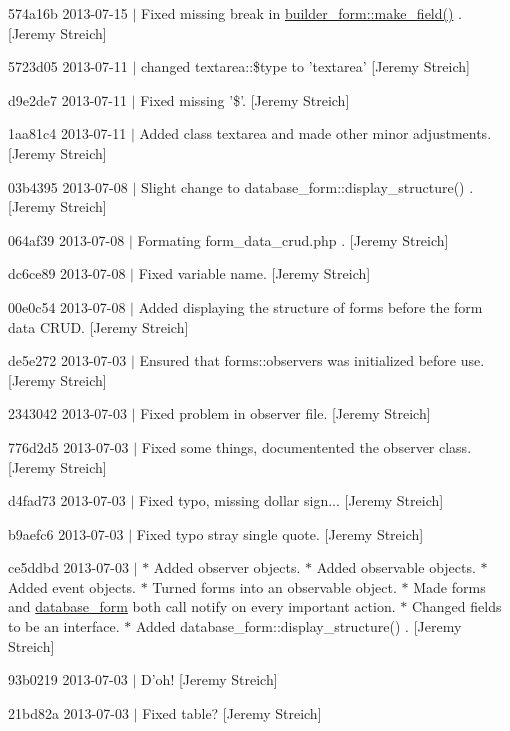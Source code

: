 \begin{DoxyItemize}
\item 574a16b 2013-\/07-\/15 $|$ Fixed missing break in \hyperlink{classbuilder__form_a6408926fe73438032738d8a0095acf8d}{builder\-\_\-form\-::make\-\_\-field()} . \mbox{[}Jeremy Streich\mbox{]}
\item 5723d05 2013-\/07-\/11 $|$ changed textarea\-::\$type to 'textarea' \mbox{[}Jeremy Streich\mbox{]}
\item d9e2de7 2013-\/07-\/11 $|$ Fixed missing '\$'. \mbox{[}Jeremy Streich\mbox{]}
\item 1aa81c4 2013-\/07-\/11 $|$ Added class textarea and made other minor adjustments. \mbox{[}Jeremy Streich\mbox{]}
\item 03b4395 2013-\/07-\/08 $|$ Slight change to database\-\_\-form\-::display\-\_\-structure() . \mbox{[}Jeremy Streich\mbox{]}
\item 064af39 2013-\/07-\/08 $|$ Formating form\-\_\-data\-\_\-crud.\-php . \mbox{[}Jeremy Streich\mbox{]}
\item dc6ce89 2013-\/07-\/08 $|$ Fixed variable name. \mbox{[}Jeremy Streich\mbox{]}
\item 00e0c54 2013-\/07-\/08 $|$ Added displaying the structure of forms before the form data C\-R\-U\-D. \mbox{[}Jeremy Streich\mbox{]}
\item de5e272 2013-\/07-\/03 $|$ Ensured that forms\-::observers was initialized before use. \mbox{[}Jeremy Streich\mbox{]}
\item 2343042 2013-\/07-\/03 $|$ Fixed problem in observer file. \mbox{[}Jeremy Streich\mbox{]}
\item 776d2d5 2013-\/07-\/03 $|$ Fixed some things, documentented the observer class. \mbox{[}Jeremy Streich\mbox{]}
\item d4fad73 2013-\/07-\/03 $|$ Fixed typo, missing dollar sign... \mbox{[}Jeremy Streich\mbox{]}
\item b9aefc6 2013-\/07-\/03 $|$ Fixed typo stray single quote. \mbox{[}Jeremy Streich\mbox{]}
\item ce5ddbd 2013-\/07-\/03 $|$ $\ast$ Added observer objects. $\ast$ Added observable objects. $\ast$ Added event objects. $\ast$ Turned forms into an observable object. $\ast$ Made forms and \hyperlink{classdatabase__form}{database\-\_\-form} both call notify on every important action. $\ast$ Changed fields to be an interface. $\ast$ Added database\-\_\-form\-::display\-\_\-structure() . \mbox{[}Jeremy Streich\mbox{]}
\item 93b0219 2013-\/07-\/03 $|$ D'oh! \mbox{[}Jeremy Streich\mbox{]}
\item 21bd82a 2013-\/07-\/03 $|$ Fixed table? \mbox{[}Jeremy Streich\mbox{]}

\end{DoxyItemize}
